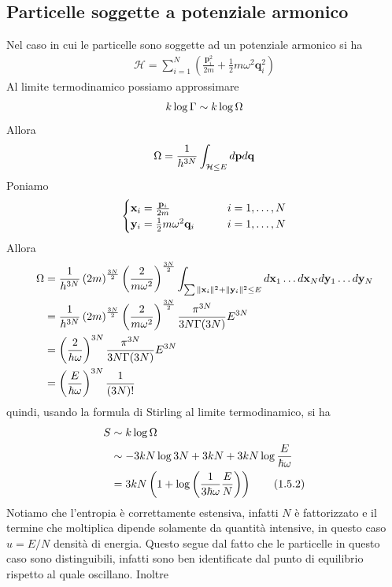 \documentclass{article}
\begin{document}
\newpage
\subsection{Particelle soggette a potenziale armonico}
Nel caso in cui le particelle sono soggette ad un potenziale armonico si ha
\begin{align}
    \mathcal{H} = \sum_{i = 1}^N \left(\frac{\mathbf{p}^2_i}{2m} + \frac{1}{2}m\omega^2\mathbf{q}^2_i\right) \tag{1.5.1}
\end{align}
Al limite termodinamico possiamo approssimare
\begin{align}
    k\log\Gamma \sim k\log\Omega \notag
\end{align}
Allora
\begin{align}
    \Omega = \frac{1}{h^{3N}} \int_{\mathcal{H} \leq E} d\mathbf{p}d\mathbf{q} \notag
\end{align}
Poniamo
\begin{align}
    \begin{cases}
        \mathbf{x}_i = \frac{\mathbf{p}_i}{2m} \qquad &i = 1, \dots, N \\
        \mathbf{y}_i = \frac{1}{2}m\omega^2\mathbf{q}_i \qquad &i = 1, \dots, N
    \end{cases} \notag
\end{align}
Allora
\begin{align}
    \Omega &= \frac{1}{h^{3N}}\left(2m\right)^{\frac{3N}{2}}\left(\frac{2}{m\omega^2}\right)^{\frac{3N}{2}}\int_{\sum \|\mathbf{x}_i\|^2 + \|\mathbf{y}_i\|^2 \leq E} d\mathbf{x}_1 \dots d\mathbf{x}_Nd\mathbf{y}_1 \dots d\mathbf{y}_N \notag \\
    &= \frac{1}{h^{3N}}\left(2m\right)^{\frac{3N}{2}}\left(\frac{2}{m\omega^2}\right)^{\frac{3N}{2}}\frac{\pi^{3N}}{3N\Gamma(3N)}E^{3N} \notag \\
    &= \left(\frac{2}{h\omega}\right)^{3N}\frac{\pi^{3N}}{3N\Gamma(3N)}E^{3N} \notag \\
    &= \left(\frac{E}{\hbar\omega}\right)^{3N}\frac{1}{(3N)!} \notag
\end{align}
quindi, usando la formula di Stirling al limite termodinamico, si ha
\begin{align}
    S &\sim k\log \Omega \notag \\
    &\sim -3kN\log 3N + 3kN + 3kN\log \frac{E}{\hbar\omega} \notag \\
    &= 3kN\left(1 + \log\left(\frac{1}{3\hbar\omega}\frac{E}{N}\right)\right) \tag{1.5.2}
\end{align}
Notiamo che l'entropia è correttamente estensiva, infatti $N$ è fattorizzato e il termine che moltiplica dipende solamente da quantità intensive, in questo caso $u = E/N$ densità di energia. Questo segue dal fatto che le particelle in questo caso sono distinguibili, infatti sono ben identificate dal punto di equilibrio rispetto al quale oscillano. Inoltre
\end{document}
